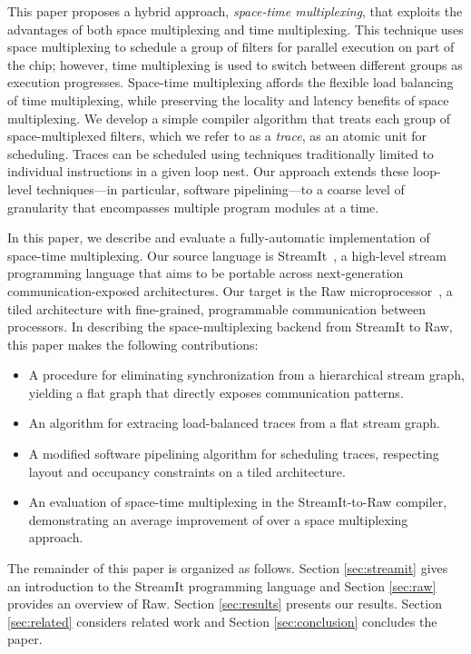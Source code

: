 This paper proposes a hybrid approach, {\it space-time multiplexing},
that exploits the advantages of both space multiplexing and time
multiplexing.  This technique uses space multiplexing to schedule a
group of filters for parallel execution on part of the chip; however,
time multiplexing is used to switch between different groups as
execution progresses.  Space-time multiplexing affords the flexible
load balancing of time multiplexing, while preserving the locality and
latency benefits of space multiplexing.  We develop a simple compiler
algorithm that treats each group of space-multiplexed filters, which
we refer to as a {\it trace}, as an atomic unit for scheduling.
Traces can be scheduled using techniques traditionally limited to
individual instructions in a given loop nest.  Our approach extends
these loop-level techniques---in particular, software pipelining---to
a coarse level of granularity that encompasses multiple program
modules at a time.

In this paper, we describe and evaluate a fully-automatic
implementation of space-time multiplexing.  Our source language is
StreamIt~\cite{streamitcc}, a high-level stream programming language
that aims to be portable across next-generation communication-exposed
architectures.  Our target is the Raw
microprocessor~\cite{raw10,raw_isca}, a tiled architecture with
fine-grained, programmable communication between processors.  In
describing the space-multiplexing backend from StreamIt to Raw, this
paper makes the following contributions:

\begin{itemize}
\item A procedure for eliminating synchronization from a hierarchical
stream graph, yielding a flat graph that directly exposes
communication patterns.
\item An algorithm for extracing load-balanced traces from a flat
stream graph.
\item A modified software pipelining algorithm for scheduling traces,
respecting layout and occupancy constraints on a tiled architecture.
\item An evaluation of space-time multiplexing in the StreamIt-to-Raw
compiler, demonstrating an average improvement of  over a
space multiplexing approach.
\end{itemize}

The remainder of this paper is organized as follows.  Section
\ref{sec:streamit} gives an introduction to the StreamIt programming
language and Section \ref{sec:raw} provides an overview of
Raw.  Section \ref{sec:results} presents our results.
Section \ref{sec:related} considers related work and Section
\ref{sec:conclusion} concludes the paper.

